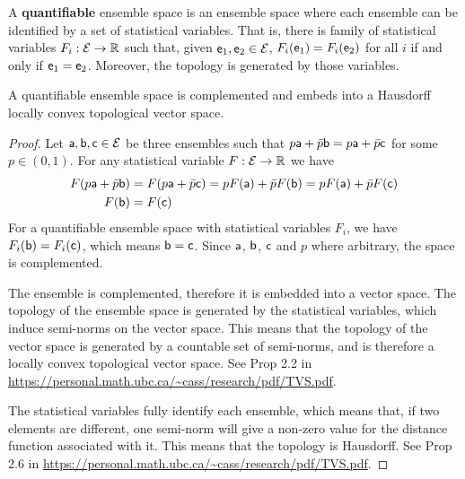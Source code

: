 \begin{defn}
	A \textbf{quantifiable} ensemble space is an ensemble space where each ensemble can be identified by a set of statistical variables. That is, there is family of statistical variables $F_i : \Ens \to \mathbb{R}$ such that, given $\ens_1, \ens_2 \in \Ens$, $F_i(\ens_1) = F_i(\ens_2)$ for all $i$ if and only if $\ens_1 = \ens_2$. Moreover, the topology is generated by those variables.
\end{defn}

\begin{prop}
	A quantifiable ensemble space is complemented and embeds into a Hausdorff locally convex topological vector space.
\end{prop}

\begin{proof}
	Let $\ens[a], \ens[b], \ens[c] \in \Ens$ be three ensembles such that $p \ens[a] + \bar{p} \ens[b] = p \ens[a] + \bar{p} \ens[c]$ for some $p \in (0,1)$. For any statistical variable $F : \Ens \to \mathbb{R}$ we have
	\begin{equation}
		\begin{aligned}
			F(p \ens[a] + \bar{p} \ens[b]) &= F(p \ens[a] + \bar{p} \ens[c]) = p F(\ens[a]) + \bar{p} F(\ens[b]) = p F(\ens[a]) + \bar{p} F(\ens[c])\\
			F(\ens[b]) &= F(\ens[c]) 
		\end{aligned}
	\end{equation}
	For a quantifiable ensemble space with statistical variables $F_i$, we have $F_i(\ens[b]) = F_i(\ens[c])$, which means $\ens[b] = \ens[c]$. Since $\ens[a]$, $\ens[b]$, $\ens[c]$ and $p$ where arbitrary, the space is complemented.
	
	The ensemble is complemented, therefore it is embedded into a vector space. The topology of the ensemble space is generated by the statistical variables, which induce semi-norms on the vector space. This means that the topology of the vector space is generated by a countable set of semi-norms, and is therefore a locally convex topological vector space. See Prop 2.2 in \url{https://personal.math.ubc.ca/~cass/research/pdf/TVS.pdf}.
	
	The statistical variables fully identify each ensemble, which means that, if two elements are different, one semi-norm will give a non-zero value for the distance function associated with it. This means that the topology is Hausdorff. See Prop 2.6 in \url{https://personal.math.ubc.ca/~cass/research/pdf/TVS.pdf}.
\end{proof}


